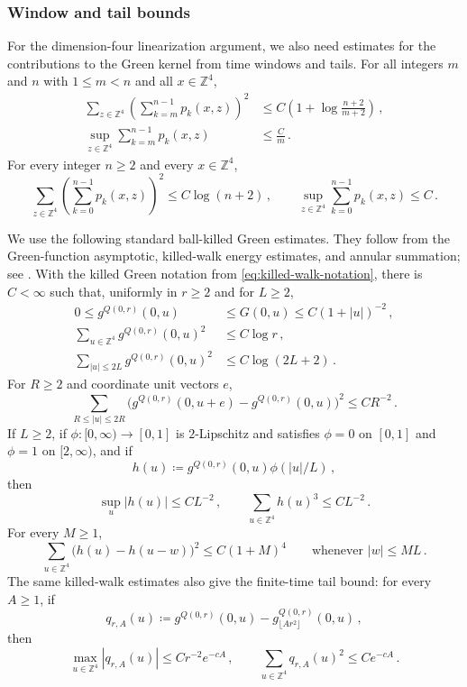 \documentclass[11pt]{amsart}
\theoremstyle{plain}
\theoremstyle{definition}
\newcommand{\Z}{\mathbb{Z}}
\begin{document}
\subsubsection{Window and tail bounds}
For the dimension-four linearization argument, we also need estimates for the contributions to the Green kernel from time windows and tails. For all integers $m$ and $n$ with $1\leq m<n$ and all
	$x\in\Z^4$,
	\begin{align}
		\sum_{z\in\Z^4}
		\left(\sum_{k=m}^{n-1}p_k(x,z)\right)^2
		&\leq
		C\left(1+\log\frac{n+2}{m+2}\right)\, ,
		\label{eq:d4-window-l2}\\
		\sup_{z\in\Z^4}\sum_{k=m}^{n-1}p_k(x,z)
		&\leq
		\frac{C}{m}\, .
		\label{eq:d4-window-linfty}
	\end{align}
	For every integer $n\geq2$ and every $x\in\Z^4$,
	\begin{equation}\label{eq:d4-full-window-bounds}
		\sum_{z\in\Z^4}
		\left(\sum_{k=0}^{n-1}p_k(x,z)\right)^2
		\leq C\log(n+2)\, ,
		\qquad
		\sup_{z\in\Z^4}\sum_{k=0}^{n-1}p_k(x,z)\leq C\, .
		\end{equation}

	We use the following standard ball-killed Green estimates. They follow from
	the Green-function asymptotic, killed-walk energy estimates, and annular
	summation; see \citet[Theorem~4.3.1 and Chapter~6]{LawlerLimic}. With the
	killed Green notation from \eqref{eq:killed-walk-notation}, there is
	$C<\infty$ such that, uniformly in $r\geq2$ and for $L\geq2$,
	\begin{align}
	    0\leq g^{Q(0,r)}(0,u)&\leq G(0,u)\leq C(1+|u|)^{-2}\, ,
	    \label{eq:d4ball-point}\\
	    \sum_{u\in\Z^4} g^{Q(0,r)}(0,u)^2&\leq C\log r\, ,
	    \label{eq:d4ball-square}\\
	    \sum_{|u|\leq2L}g^{Q(0,r)}(0,u)^2
	    &\leq C\log(2L+2)\, .
	    \label{eq:d4ball-near}
	\end{align}
	For $R\geq2$ and coordinate unit vectors $e$,
	\[
	    \sum_{R\leq |u|\leq2R}
	    \bigl(g^{Q(0,r)}(0,u+e)-g^{Q(0,r)}(0,u)\bigr)^2
	    \leq CR^{-2}\, .
	\]
	If $L\geq2$, if $\phi:[0,\infty)\to[0,1]$ is $2$-Lipschitz and satisfies $\phi=0$ on $[0,1]$
	and $\phi=1$ on $[2,\infty)$, and if
	\[
	    h(u)\coloneqq g^{Q(0,r)}(0,u)\phi(|u|/L)\, ,
	\]
	then
	\begin{equation}\label{eq:d4ball-far-cube}
	    \sup_u |h(u)|\leq CL^{-2}\, ,
	    \qquad
	    \sum_{u\in\Z^4} h(u)^3\leq CL^{-2}\, .
	\end{equation}
	For every $M\geq1$,
	\begin{equation}\label{eq:d4ball-shift}
	    \sum_{u\in\Z^4}\bigl(h(u)-h(u-w)\bigr)^2
	    \leq C(1+M)^4
	    \qquad\text{whenever }|w|\leq ML\, .
	\end{equation}
	The same killed-walk estimates also give the finite-time tail bound: for
	every $A\geq1$, if
	\[
	    q_{r,A}(u)\coloneqq
	    g^{Q(0,r)}(0,u)-g_{\lfloor Ar^2\rfloor}^{Q(0,r)}(0,u)\, ,
	\]
	then
	\begin{equation}\label{eq:d4ball-time-tail}
	    \max_{u\in\Z^4}|q_{r,A}(u)|\leq Cr^{-2}e^{-cA}\, ,
	    \qquad
	    \sum_{u\in\Z^4}q_{r,A}(u)^2\leq Ce^{-cA}\, .
	\end{equation}
\end{document}
